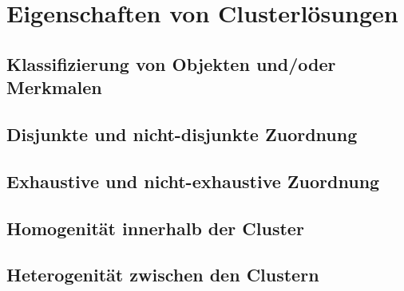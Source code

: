 \chapter{Eigenschaften von Clusterlösungen}

\section{Klassifizierung von Objekten und/oder Merkmalen}
\section{Disjunkte und nicht-disjunkte Zuordnung}
\section{Exhaustive und nicht-exhaustive Zuordnung}
\section{Homogenität innerhalb der Cluster}
\section{Heterogenität zwischen den Clustern}